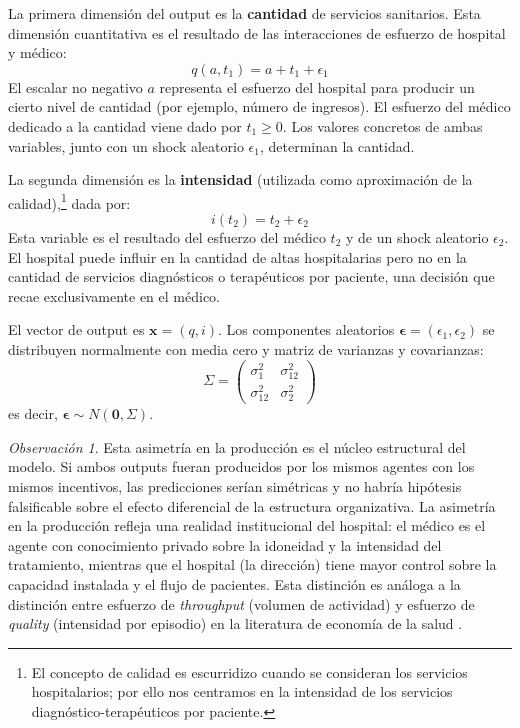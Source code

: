 \documentclass[12pt, a4paper, twoside, openright]{book}
\theoremstyle{plain}
\theoremstyle{definition}
\theoremstyle{remark}
\newtheorem{remark}{Observación}[chapter]
\begin{document}
La primera dimensión del output es la \textbf{cantidad} de servicios sanitarios. Esta dimensión cuantitativa es el resultado de las interacciones de esfuerzo de hospital y médico:
\begin{equation}
  q(a,t_1)=a+t_1+\epsilon_1
  \label{eq:q}
\end{equation}
El escalar no negativo $a$ representa el esfuerzo del hospital para producir un cierto nivel de cantidad (por ejemplo, número de ingresos). El esfuerzo del médico dedicado a la cantidad viene dado por $t_1 \geq 0$. Los valores concretos de ambas variables, junto con un shock aleatorio $\epsilon_1$, determinan la cantidad.

La segunda dimensión es la \textbf{intensidad} (utilizada como aproximación de la calidad),\footnote{El concepto de calidad es escurridizo cuando se consideran los servicios hospitalarios; por ello nos centramos en la intensidad de los servicios diagnóstico-terapéuticos por paciente.} dada por:
\begin{equation}
  i(t_2)=t_2+\epsilon_2
  \label{eq:i}
\end{equation}
Esta variable es el resultado del esfuerzo del médico $t_2$ y de un shock aleatorio $\epsilon_2$. El hospital puede influir en la cantidad de altas hospitalarias pero no en la cantidad de servicios diagnósticos o terapéuticos por paciente, una decisión que recae exclusivamente en el médico.

El vector de output es $\bm{x}=(q,i)$. Los componentes aleatorios $\bm{\epsilon}=(\epsilon_1, \epsilon_2)$ se distribuyen normalmente con media cero y matriz de varianzas y covarianzas:
\begin{equation}
  \Sigma=\begin{pmatrix}
    \sigma^2_1 & \sigma^2_{12} \\
    \sigma^2_{12} & \sigma^2_2
  \end{pmatrix}
  \label{eq:sigma}
\end{equation}
es decir, $\bm{\epsilon}\sim N(\mathbf{0},\Sigma)$.

\begin{remark}
Esta asimetría en la producción es el núcleo estructural del modelo. Si ambos outputs fueran producidos por los mismos agentes con los mismos incentivos, las predicciones serían simétricas y no habría hipótesis falsificable sobre el efecto diferencial de la estructura organizativa. La asimetría en la producción refleja una realidad institucional del hospital: el médico es el agente con conocimiento privado sobre la idoneidad y la intensidad del tratamiento, mientras que el hospital (la dirección) tiene mayor control sobre la capacidad instalada y el flujo de pacientes. Esta distinción es análoga a la distinción entre esfuerzo de \textit{throughput} (volumen de actividad) y esfuerzo de \textit{quality} (intensidad por episodio) en la literatura de economía de la salud \citep{eggleston2005,kaarboe2011}.
\end{remark}
\end{document}
